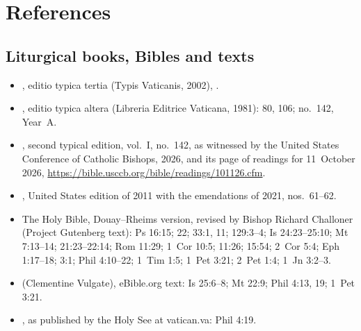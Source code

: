 \section*{References}

{\footnotesize
\subsection*{Liturgical books, Bibles and texts}
\begin{itemize}[itemsep=0pt,topsep=.2em]
\item {}, editio typica tertia (Typis Vaticanis, 2002), .
\item {}, editio typica altera (Libreria Editrice Vaticana, 1981):  80, 106; no.~142, Year~A.
\item {}, second typical edition, vol.~I, no.~142, as witnessed by the United States Conference of Catholic Bishops,  2026, and its page of readings for 11~October 2026, \url{https://bible.usccb.org/bible/readings/101126.cfm}.
\item {}, United States edition of 2011 with the emendations of 2021, nos.~61--62.
\item The Holy Bible, Douay--Rheims version, revised by Bishop Richard Challoner (Project Gutenberg text): Ps 16:15; 22; 33:1, 11; 129:3--4; Is 24:23--25:10; Mt 7:13--14; 21:23--22:14; Rom 11:29; 1~Cor 10:5; 11:26; 15:54; 2~Cor 5:4; Eph 1:17--18; 3:1; Phil 4:10--22; 1~Tim 1:5; 1~Pet 3:21; 2~Pet 1:4; 1~Jn 3:2--3.
\item {} (Clementine Vulgate), eBible.org text: Is 25:6--8; Mt 22:9; Phil 4:13, 19; 1~Pet 3:21.
\item {}, as published by the Holy See at vatican.va: Phil 4:19.
\end{itemize}

}

